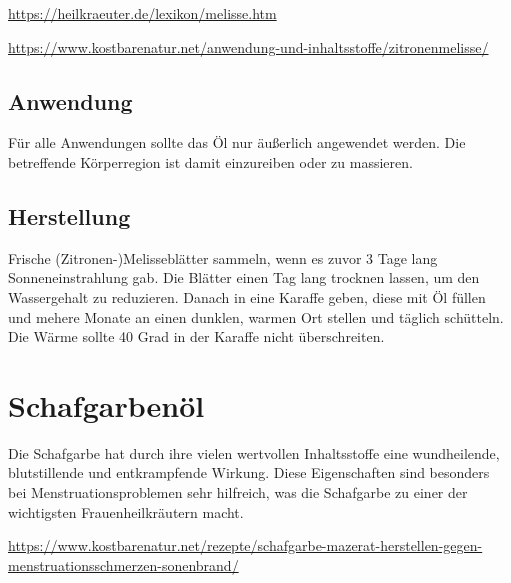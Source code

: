 \cite{heilkraeuterlexikon} 

\url{https://heilkraeuter.de/lexikon/melisse.htm} 

\url{https://www.kostbarenatur.net/anwendung-und-inhaltsstoffe/zitronenmelisse/}

 

\subsection{Anwendung}

Für alle Anwendungen sollte das Öl nur äußerlich angewendet werden. Die betreffende Körperregion ist damit einzureiben oder zu massieren.

\subsection{Herstellung}

Frische (Zitronen-)Melisseblätter sammeln, wenn es zuvor 3 Tage lang Sonneneinstrahlung gab. Die Blätter einen Tag lang trocknen lassen, um den Wassergehalt zu reduzieren. Danach in eine Karaffe geben, diese mit Öl füllen und mehere Monate an einen dunklen, warmen Ort stellen und täglich schütteln. Die Wärme sollte 40 Grad in der Karaffe nicht überschreiten.





\newpage



\section{Schafgarbenöl}

Die Schafgarbe hat durch ihre vielen wertvollen Inhaltsstoffe eine wundheilende, blutstillende und entkrampfende Wirkung. Diese Eigenschaften sind besonders bei Menstruationsproblemen sehr hilfreich, was die Schafgarbe zu einer der wichtigsten Frauenheilkräutern macht.


\url{https://www.kostbarenatur.net/rezepte/schafgarbe-mazerat-herstellen-gegen-menstruationsschmerzen-sonenbrand/}


     

